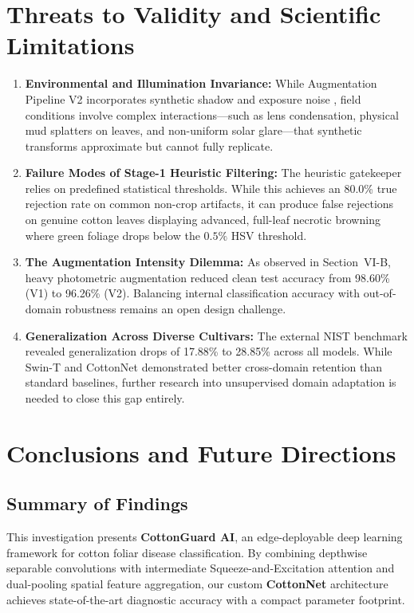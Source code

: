 \documentclass[journal,10pt,twocolumn]{IEEEtran}
\begin{document}
\section{Threats to Validity and Scientific Limitations}
\begin{enumerate}[leftmargin=*]
    \item \textbf{Environmental and Illumination Invariance:} While Augmentation Pipeline V2 incorporates synthetic shadow and exposure noise \cite{buslaev2020albumentations}, field conditions involve complex interactions---such as lens condensation, physical mud splatters on leaves, and non-uniform solar glare---that synthetic transforms approximate but cannot fully replicate.
    \item \textbf{Failure Modes of Stage-1 Heuristic Filtering:} The heuristic gatekeeper relies on predefined statistical thresholds. While this achieves an 80.0\% true rejection rate on common non-crop artifacts, it can produce false rejections on genuine cotton leaves displaying advanced, full-leaf necrotic browning where green foliage drops below the $0.5\%$ HSV threshold.
    \item \textbf{The Augmentation Intensity Dilemma:} As observed in Section~VI-B, heavy photometric augmentation reduced clean test accuracy from 98.60\% (V1) to 96.26\% (V2). Balancing internal classification accuracy with out-of-domain robustness remains an open design challenge.
    \item \textbf{Generalization Across Diverse Cultivars:} The external NIST benchmark revealed generalization drops of 17.88\% to 28.85\% across all models. While Swin-T and CottonNet demonstrated better cross-domain retention than standard baselines, further research into unsupervised domain adaptation is needed to close this gap entirely.
\end{enumerate}

\section{Conclusions and Future Directions}

\subsection{Summary of Findings}
This investigation presents \textbf{CottonGuard AI}, an edge-deployable deep learning framework for cotton foliar disease classification. By combining depthwise separable convolutions with intermediate Squeeze-and-Excitation attention and dual-pooling spatial feature aggregation, our custom \textbf{CottonNet} architecture achieves state-of-the-art diagnostic accuracy with a compact parameter footprint.
\end{document}

